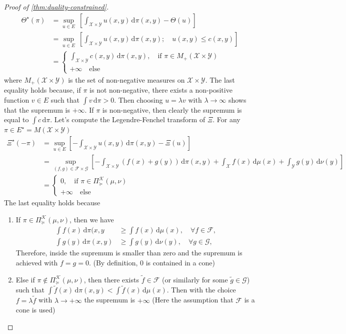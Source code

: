 \documentclass[10pt]{article}
\newcommand{\ud}{\,\mathrm{d}}
\renewcommand{\tilde}{\widetilde}
\newcommand{\calF}{\mathcal{F}}
\newcommand{\calG}{\mathcal{G}}
\newcommand{\calK}{\mathcal{K}}
\newcommand{\calX}{\mathcal{X}}
\newcommand{\calY}{\mathcal{Y}}
\numberwithin{equation}{section}
\begin{document}
\begin{proof}[Proof of \autoref{thm:duality-constrained}]
\begin{align*}
	\Theta^\star(\pi) &= \sup_{u\in E}~[\int_{\calX\times \calY} u(x,y)\ud \pi(x,y)-\Theta(u)]\\ &= \sup_{u\in E}~[\int_{\calX\times \calY} u(x,y)\ud \pi(x,y);\quad u(x,y)\leq c(x,y)]\\
	&= \begin{cases}
	\int_{\calX\times \calY} c(x,y)\ud \pi(x,y),\quad \text{if } \pi \in M_+(\calX\times \calY)\\
	+\infty\quad\text{else}
	\end{cases}
	\end{align*}
	where $M_+(\calX \times \calY)$ is the set of non-negative measures on $\calX\times \calY$. The last equality holds because, if $\pi$ is not non-negative, there exists a non-positive function $v\in E$ such that $\int v \ud \pi>0$. Then choosing $u=\lambda v$ with $\lambda \to \infty$ shows that the supremum is $+\infty$. If $\pi$ is non-negative, then clearly the supremum is equal to $\int c \ud \pi$. Let's compute the Legendre-Fenchel transform of $\Xi$. For any $\pi \in E^\star=M(\calX \times \calY)$ 
	\begin{align*}
	\Xi^\star(-\pi) &= \sup_{u\in E} [-\int_{\calX\times \calY} u(x,y)\ud \pi(x,y)-\Xi(u)]\\&=\sup_{(f,g) \in \calF \times \calG} [-\int_{\calX\times \calY} (f(x)+g(y))\ud \pi(x,y) + \int_\calX f(x) \ud\mu(x) + \int_\calY g(y) \ud \nu(y)]\\
	&=\begin{cases}
	0,\quad \text{if } \pi \in \Pi_\succeq^\calK(\mu,\nu) \\
	+\infty\quad\text{else}
	\end{cases}
	\end{align*} 
	The last equality holds because
	\begin{enumerate}
		\item If $\pi \in \Pi_\succeq^\calK(\mu,\nu)$, then we have 
		\begin{align*}
		\int f(x)\ud \pi(x,y&\geq \int f(x)\ud \mu(x),\quad \forall f \in \calF,\\ \int g(y)\ud \pi(x,y)&\geq\int g(y)\ud \nu(y),\quad \forall g \in \calG,
		\end{align*}
		Therefore, inside the supremum is smaller than zero and the supremum is achieved with $f=g=0$. (By definition, $0$ is contained in a cone)
		\item Else if $\pi \notin \Pi_\succeq^\calK(\mu,\nu)$, then there exists $\tilde{f}\in \calF$ (or similarly for some $\tilde{g} \in \calG$) such that $\int \tilde{f}(x)\ud\pi(x,y)<\int \tilde{f}(x)\ud \mu(x)$. Then with the choice $f = \lambda \tilde{f} $ with $\lambda \to +\infty$ the supremum is $+\infty$ (Here the assumption that $\calF$ is a cone is used)

\end{enumerate}
\end{proof}
\end{document}
